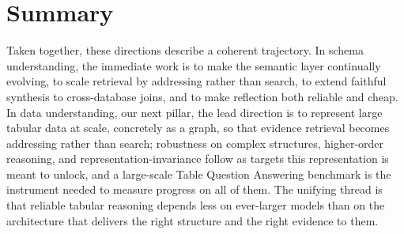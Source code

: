 \section{Summary}
Taken together, these directions describe a coherent trajectory. In schema understanding, the immediate work is to make the semantic layer continually evolving, to scale retrieval by addressing rather than search, to extend faithful synthesis to cross-database joins, and to make reflection both reliable and cheap. In data understanding, our next pillar, the lead direction is to represent large tabular data at scale, concretely as a graph, so that evidence retrieval becomes addressing rather than search; robustness on complex structures, higher-order reasoning, and representation-invariance follow as targets this representation is meant to unlock, and a large-scale Table Question Answering benchmark is the instrument needed to measure progress on all of them. The unifying thread is that reliable tabular reasoning depends less on ever-larger models than on the architecture that delivers the right structure and the right evidence to them.
